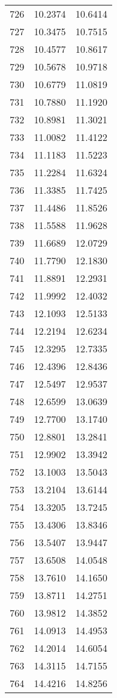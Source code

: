 \documentclass{article}
\begin{document}
\begin{longtable}{|c|c|c|}
726 & 10.2374 & 10.6414 \\
727 & 10.3475 & 10.7515 \\
728 & 10.4577 & 10.8617 \\
729 & 10.5678 & 10.9718 \\
730 & 10.6779 & 11.0819 \\
731 & 10.7880 & 11.1920 \\
732 & 10.8981 & 11.3021 \\
733 & 11.0082 & 11.4122 \\
734 & 11.1183 & 11.5223 \\
735 & 11.2284 & 11.6324 \\
736 & 11.3385 & 11.7425 \\
737 & 11.4486 & 11.8526 \\
738 & 11.5588 & 11.9628 \\
739 & 11.6689 & 12.0729 \\
740 & 11.7790 & 12.1830 \\
741 & 11.8891 & 12.2931 \\
742 & 11.9992 & 12.4032 \\
743 & 12.1093 & 12.5133 \\
744 & 12.2194 & 12.6234 \\
745 & 12.3295 & 12.7335 \\
746 & 12.4396 & 12.8436 \\
747 & 12.5497 & 12.9537 \\
748 & 12.6599 & 13.0639 \\
749 & 12.7700 & 13.1740 \\
750 & 12.8801 & 13.2841 \\
751 & 12.9902 & 13.3942 \\
752 & 13.1003 & 13.5043 \\
753 & 13.2104 & 13.6144 \\
754 & 13.3205 & 13.7245 \\
755 & 13.4306 & 13.8346 \\
756 & 13.5407 & 13.9447 \\
757 & 13.6508 & 14.0548 \\
758 & 13.7610 & 14.1650 \\
759 & 13.8711 & 14.2751 \\
760 & 13.9812 & 14.3852 \\
761 & 14.0913 & 14.4953 \\
762 & 14.2014 & 14.6054 \\
763 & 14.3115 & 14.7155 \\
764 & 14.4216 & 14.8256 \\

\end{longtable}
\end{document}
